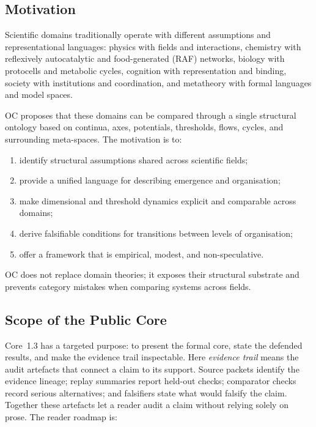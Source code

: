 \subsection{Motivation}

Scientific domains traditionally operate with different assumptions and
representational languages: physics with fields and interactions, chemistry
with reflexively autocatalytic and food-generated (RAF) networks,
biology with protocells and metabolic cycles, cognition with representation and
binding, society with institutions and coordination, and metatheory with
formal languages and model spaces.

OC proposes that these domains can be compared through a single structural
ontology based on continua, axes, potentials, thresholds, flows, cycles, and
surrounding meta-spaces. The motivation is to:

\begin{enumerate}
    \item identify structural assumptions shared across scientific fields;
    \item provide a unified language for describing emergence and organisation;
    \item make dimensional and threshold dynamics explicit and comparable across domains;
    \item derive falsifiable conditions for transitions between levels of organisation;
    \item offer a framework that is empirical, modest, and non-speculative.
\end{enumerate}

OC does not replace domain theories; it exposes their structural substrate and prevents category mistakes when comparing systems across fields.

\subsection{Scope of the Public Core}

Core~1.3 has a targeted purpose: to present the formal core, state the defended
results, and make the evidence trail inspectable. Here \emph{evidence trail}
means the audit artefacts that connect a claim to its support. Source packets
identify the evidence lineage; replay summaries report held-out checks; comparator
checks record serious alternatives; and falsifiers state what would falsify
the claim. Together these artefacts let a reader audit a claim without relying
solely on prose. The reader roadmap is:

